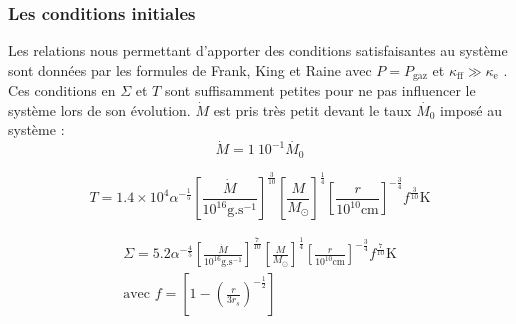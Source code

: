 \subsubsection{Les conditions initiales}
Les relations nous permettant d'apporter des conditions satisfaisantes au système sont données par les formules de Frank, King et Raine avec $P = P_\textrm{gaz}$ et $\kappa_\textrm{ff} \gg \kappa_\textrm{e}$ \cite{F_K_R-1985}. Ces conditions en $\Sigma$ et $T$ sont suffisamment petites pour ne pas influencer le système lors de son évolution. $\dot{M}$ est pris très petit devant  le taux $\dot{M_{0}}$ imposé au système : 
\begin{equation}
	\dot{M} = 1\ 10^{-1 }\dot{M_{0}}
\end{equation} 

\begin{equation}
	T = 1.4 \times 10^{4} \alpha^{- \frac{1}{5}} \left[ \frac{\dot{M}}{10^{16} \mathrm{g.s}^{-1}} \right]^{\frac{3}{10}} \left[ \frac{M}{M_\odot}\right]^{\frac{1}{4}} \left[ \frac{r}{10^{10}\mathrm{cm}}\right]^{- \frac{3}{4}} f^{\frac{3}{10}} \mathrm{K} 
\end{equation}

\begin{align}
	\Sigma = 5.2 \alpha^{- \frac{4}{5}} \left[ \frac{\dot{M}}{10^{16} \mathrm{g.s}^{-1}} \right]^{\frac{7}{10}} \left[ \frac{M}{M_\odot}\right]^{\frac{1}{4}} \left[ \frac{r}{10^{10} \mathrm{cm}}\right]^{- \frac{3}{4}} f^{\frac{7}{10}} \mbox{K}  \\ 
	\text{avec } f = \left[ 1 - \left( \frac{r}{3 r_{s}}\right)^{- \frac{1}{2}}\right]
\end{align}

